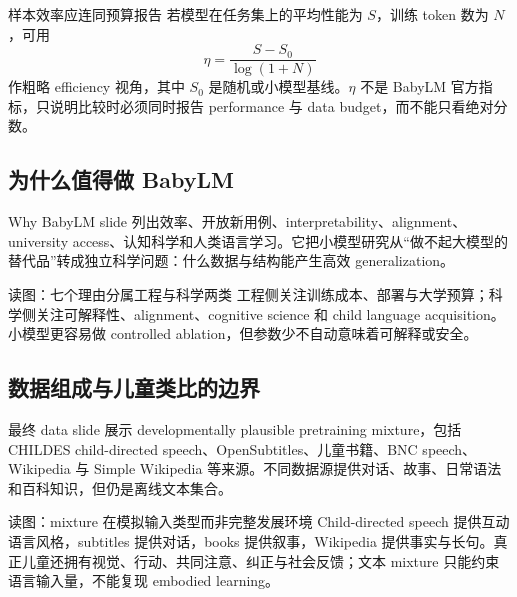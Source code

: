 \begin{importantbox}{样本效率应连同预算报告}
若模型在任务集上的平均性能为 $S$，训练 token 数为 $N$，可用
\[
\eta=\frac{S-S_0}{\log(1+N)}
\]
作粗略 efficiency 视角，其中 $S_0$ 是随机或小模型基线。$\eta$ 不是 BabyLM 官方指标，只说明比较时必须同时报告 performance 与 data budget，而不能只看绝对分数。
\end{importantbox}

\subsection{为什么值得做 BabyLM}

Why BabyLM slide 列出效率、开放新用例、interpretability、alignment、university access、认知科学和人类语言学习。它把小模型研究从“做不起大模型的替代品”转成独立科学问题：什么数据与结构能产生高效 generalization。


\begin{knowledgebox}{读图：七个理由分属工程与科学两类}
工程侧关注训练成本、部署与大学预算；科学侧关注可解释性、alignment、cognitive science 和 child language acquisition。小模型更容易做 controlled ablation，但参数少不自动意味着可解释或安全。
\end{knowledgebox}


\subsection{数据组成与儿童类比的边界}

最终 data slide 展示 developmentally plausible pretraining mixture，包括 CHILDES child-directed speech、OpenSubtitles、儿童书籍、BNC speech、Wikipedia 与 Simple Wikipedia 等来源。不同数据源提供对话、故事、日常语法和百科知识，但仍是离线文本集合。


\begin{knowledgebox}{读图：mixture 在模拟输入类型而非完整发展环境}
Child-directed speech 提供互动语言风格，subtitles 提供对话，books 提供叙事，Wikipedia 提供事实与长句。真正儿童还拥有视觉、行动、共同注意、纠正与社会反馈；文本 mixture 只能约束语言输入量，不能复现 embodied learning。
\end{knowledgebox}

